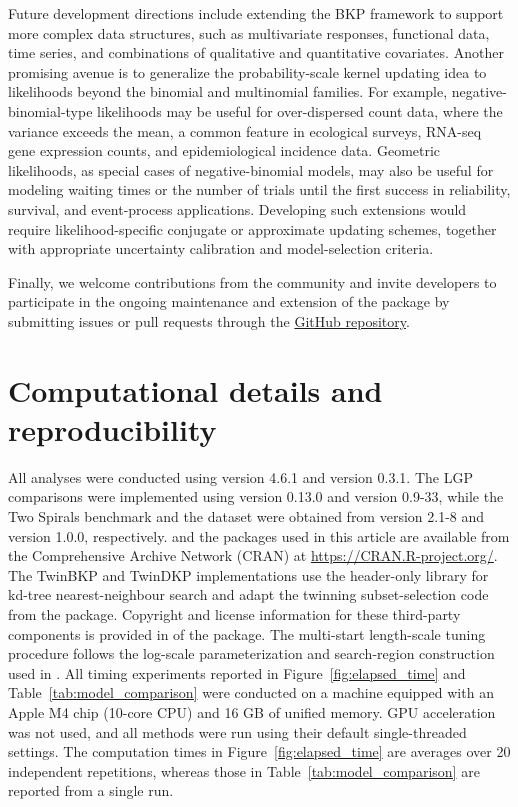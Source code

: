 \documentclass[article, shortnames]{jss}
\begin{document}
Future development directions include extending the BKP framework to support more complex data structures, such as multivariate responses, functional data, time series, and combinations of qualitative and quantitative covariates.
Another promising avenue is to generalize the probability-scale kernel updating idea to likelihoods beyond the binomial and multinomial families.
For example, negative-binomial-type likelihoods may be useful for over-dispersed count data, where the variance exceeds the mean, a common feature in ecological surveys, RNA-seq gene expression counts, and epidemiological incidence data.
Geometric likelihoods, as special cases of negative-binomial models, may also be useful for modeling waiting times or the number of trials until the first success in reliability, survival, and event-process applications.
Developing such extensions would require likelihood-specific conjugate or approximate updating schemes, together with appropriate uncertainty calibration and model-selection criteria.

Finally, we welcome contributions from the community and invite developers to participate in the ongoing maintenance and extension of the package by submitting issues or pull requests through the \href{https://github.com/Jiangyan-Zhao/BKP}{ GitHub repository}.



\section*{Computational details  and reproducibility}
All analyses were conducted using  version 4.6.1 and  version 0.3.1. The LGP comparisons were implemented using  version 0.13.0 and  version 0.9-33, while the Two Spirals benchmark and the  dataset were obtained from  version 2.1-8 and  version 1.0.0, respectively.  and the  packages used in this article are available from the Comprehensive  Archive Network (CRAN) at \url{https://CRAN.R-project.org/}. The TwinBKP and TwinDKP implementations use the header-only  library for kd-tree nearest-neighbour search and adapt the twinning subset-selection code from the  package. Copyright and license information for these third-party components is provided in  of the  package. The multi-start length-scale tuning procedure follows the log-scale parameterization and search-region construction used in . 
All timing experiments reported in Figure~\ref{fig:elapsed_time} and Table~\ref{tab:model_comparison} were conducted on a machine equipped
with an Apple M4 chip (10-core CPU) and 16 GB of unified memory.
GPU acceleration was not used, and all methods were run using their default single-threaded settings. 
The computation times in Figure~\ref{fig:elapsed_time} are averages over 20 independent repetitions, whereas those in Table~\ref{tab:model_comparison} are reported from a single run.
\end{document}
